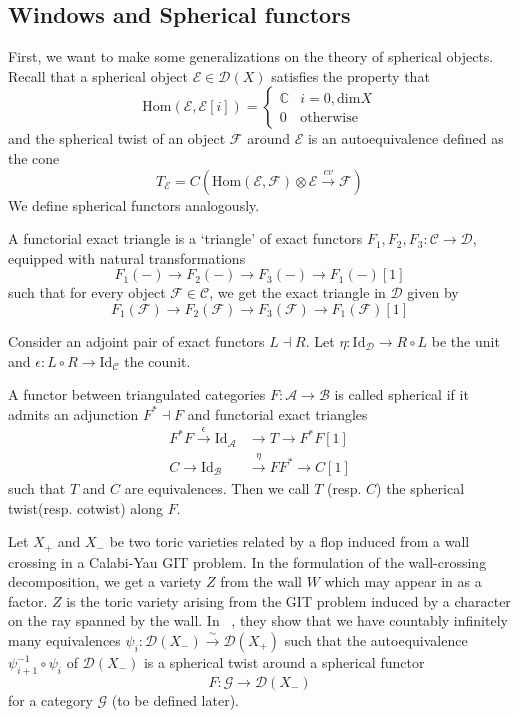 \subsection{Windows and Spherical functors}

First, we want to make some generalizations on the theory of spherical objects. Recall that a spherical object $\mathcal{E} \in \mathcal{D}(X)$ satisfies the property that $$\mathrm{Hom}(\mathcal{E}, \mathcal{E}[i])= \begin{cases}
\mathbb{C} & i=0,\mathrm{dim}X  \\
0 & \text{otherwise}
\end{cases}$$
and the spherical twist of an object $\mathcal{F}$ around $\mathcal{E}$ is an autoequivalence defined as the cone $$T_\mathcal{E} = C(\mathrm{Hom}(\mathcal{E},\mathcal{F})\otimes \mathcal{E}\xrightarrow{ev} \mathcal{F})$$
We define spherical functors analogously.


\begin{definition}{}{}
	A functorial exact triangle is a `triangle' of exact functors $F_{1}, F_{2}, F_{3} : \mathcal{C}\to \mathcal{D}$,    equipped with natural transformations $$
F_{1}(-)\to F_{2}(-)\to F_{3}(-)\to F_{1}(-)[1]
$$ such that for every object $\mathcal{F}\in \mathcal{C}$,   we get the exact triangle in $\mathcal{D}$ given by $$
F_{1}(\mathcal{F})\to F_{2}(\mathcal{F})\to F_{3}(\mathcal{F})\to F_{1}(\mathcal{F})[1]
$$
\end{definition}

Consider an adjoint pair of exact functors $L \dashv R$. Let $\eta : \mathrm{Id}_\mathcal{D}\to R\circ L$ be the unit and $\epsilon : L\circ R \to \mathrm{Id}_\mathcal{C}$ the counit. 

\begin{definition}{}{}
A functor between triangulated categories $F: \mathcal{A}\to \mathcal{B}$ is called spherical if it admits an adjunction $F^{*}\dashv F$ and  functorial exact triangles 
\begin{align*}
F^{*}F \xrightarrow{\epsilon} \mathrm{Id}_\mathcal{A}&\to T \to F^{*}F [1] \\
C\to \mathrm{Id}_\mathcal{B}&\xrightarrow{\eta} F F^{*}\to C[1]
\end{align*} such that $T$ and $C$ are equivalences. Then we call $T$ (resp. $C$) the spherical twist(resp. cotwist) along $F$. 
\end{definition}

Let $X_+$ and $X_-$ be two toric varieties related by a flop induced from a wall crossing in a Calabi-Yau GIT problem. In the formulation of the wall-crossing decomposition, we get a variety $Z$ from the wall $W$ which may appear in as a factor. $Z$ is the toric variety arising from the GIT problem induced by a character on the ray spanned by the wall. In ~\cite{halpernleistner2016autoequivalences}, they show that we have countably infinitely many equivalences $\psi_{i}: \mathcal{D}(X_{-})\xrightarrow{\sim} \mathcal{D}(X_{+})$  such that the autoequivalence $\psi_{i+1}^{-1}\circ \psi_i$ of $\mathcal{D}(X_{-})$ is a spherical twist around a spherical functor $$F : \mathcal{G}\to \mathcal{D}(X_{-})$$ for a category $\mathcal{G}$ (to be defined later).

